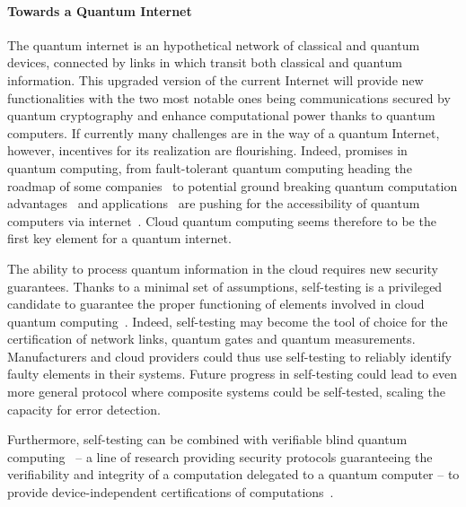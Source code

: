\paragraph{Towards a Quantum Internet}

The quantum internet is an hypothetical network of classical and quantum devices, connected by links in which transit both classical and quantum information.
This upgraded version of the current Internet will provide new functionalities with the two most notable ones being communications secured by quantum cryptography and enhance computational power thanks to quantum computers.
If currently many challenges are in the way of a quantum Internet, however, incentives for its realization are flourishing.
Indeed, promises in quantum computing, from fault-tolerant quantum computing heading the roadmap of some companies~\cite{Google2022,Intel2022,IBM2022} to potential ground breaking quantum computation advantages~\cite{Deutsch1992,Shor1994,Grover1996} and applications~\cite{Bauer2020,Paudel2022} are pushing for the accessibility of quantum computers via internet~\cite{Rietsche2022}.
Cloud quantum computing seems therefore to be the first key element for a quantum internet.

\medbreak

The ability to process quantum information in the cloud requires new security guarantees.
Thanks to a minimal set of assumptions, self-testing is a privileged candidate to guarantee the proper functioning of elements involved in cloud quantum computing~\cite{Sekatski2018}.
Indeed, self-testing may become the tool of choice for the certification of network links, quantum gates and quantum measurements.
Manufacturers and cloud providers could thus use self-testing to reliably identify faulty elements in their systems.
Future progress in self-testing could lead to even more general protocol where composite systems could be self-tested, scaling the capacity for error detection.

Furthermore, self-testing can be combined with verifiable blind quantum computing~\cite{Fitzsimons2017,Eisert2020} -- a line of research providing security protocols guaranteeing the verifiability and integrity of a computation delegated to a quantum computer -- to provide device-independent certifications of computations~\cite{Gheorghiu2015,Hajdusek2015}.

\medbreak

